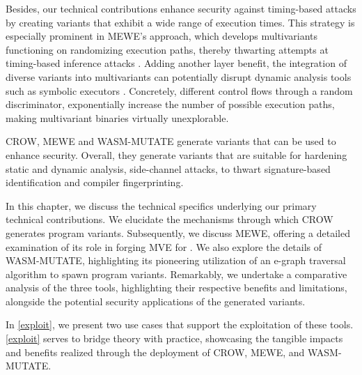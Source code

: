 Besides, our technical contributions enhance security against timing-based attacks by creating variants that exhibit a wide range of execution times. 
This strategy is especially prominent in MEWE’s approach, which develops multivariants functioning on randomizing execution paths, thereby thwarting attempts at timing-based inference attacks \cite{DBLP:conf/ndss/SchnitzlerKBP23}. 
Adding another layer benefit, the integration of diverse variants into multivariants can potentially disrupt dynamic analysis tools such as symbolic executors \cite{wasmixer}. 
Concretely, different control flows through a random discriminator, exponentially increase the number of possible execution paths, making multivariant binaries virtually unexplorable.


\begin{tcolorbox}[title=Takeaway,boxrule=1pt,arc=.2em,boxsep=1.0mm]
    CROW, MEWE and WASM-MUTATE generate \Wasm variants that can be used to enhance security. 
    Overall, they generate variants that are suitable for hardening static and dynamic analysis, side-channel attacks, to thwart signature-based identification and compiler fingerprinting. 
\end{tcolorbox}



In this chapter, we discuss the technical specifics underlying our primary technical contributions.
We elucidate the mechanisms through which CROW generates program variants.
Subsequently, we discuss MEWE, offering a detailed examination of its role in forging MVE for \Wasm. 
We also explore the details of WASM-MUTATE, highlighting its pioneering utilization of an e-graph traversal algorithm to spawn \wasm program variants. 
Remarkably, we undertake a comparative analysis of the three tools, highlighting their respective benefits and limitations, alongside the potential security applications of the generated \wasm variants. 

In \autoref{exploit}, we present two use cases that support the exploitation of these tools.
\autoref{exploit} serves to bridge theory with practice, showcasing the tangible impacts and benefits realized through the deployment of CROW, MEWE, and WASM-MUTATE.
